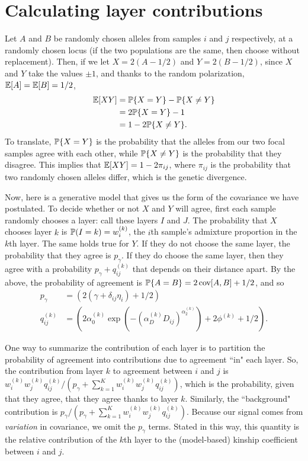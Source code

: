 \documentclass[12pt]{article}
\begin{document}
\newpage
\section{Calculating layer contributions}\label{layer_contribution}

Let $A$ and $B$ be randomly chosen alleles from samples $i$ and $j$ respectively,
at a randomly chosen locus 
(if the two populations are the same, then choose without replacement).
Then, if we let $X=2(A-1/2)$ and $Y=2(B-1/2)$,
since $X$ and $Y$ take the values $\pm 1$,
and thanks to the random polarization, $\E[A] = \E[B] = 1/2$,
$$\begin{aligned}
\E[XY]
        &= \P\{ X=Y \} - \P\{ X \neq Y \} \\
        &= 2 \P\{ X=Y \} - 1 \\
        &= 1 - 2 \P\{ X \neq Y \} .
\end{aligned}$$
To translate, $\P\{ X=Y \}$ is the probability that the alleles from our two focal samples agree with each other,
while $\P\{ X \neq Y \}$ is the probability that they disagree.
This implies that $\E[XY] = 1 - 2 \pi_{ij}$, 
where $\pi_{ij}$ is the probability that two randomly chosen alleles differ, 
which is the genetic divergence.

Now, here is a generative model that gives us the form of the covariance we have postulated.
To decide whether or not $X$ and $Y$ will agree,
first each sample randomly chooses a layer: call these layers $I$ and $J$.
The probability that $X$ chooses layer $k$ is $\P({I=k})=w_i^{(k)}$, 
the $i$th sample's admixture proportion in the $k$th layer.
The same holds true for $Y$.
If they do not choose the same layer, the probability that they agree is $p_\gamma$.
If they do choose the same layer, 
then they agree with a probability $p_\gamma + q^{(k)}_{ij}$ that depends on their distance apart.
By the above,
the probability of agreement is $\P\{A=B\} = 2 \cov[A,B] + 1/2$,
and so
$$\begin{aligned}
    p_\gamma &= (2 (\gamma + \delta_{ij} \eta_i) + 1/2) \\
    q^{(k)}_{ij} &= \left(2 \alpha_0^{(k)} \exp\left( - \left(\alpha_D^{(k)} D_{ij}\right)^{\alpha_2^{(k)}} \right) + 2 \phi^{(k)}  + 1/2 \right) .
\end{aligned}$$

One way to summarize the contribution of each layer is to partition the probability of agreement
into contributions due to agreement ``in" each layer.
So, the contribution from layer $k$ to agreement between $i$ and $j$ is 
$w_i^{(k)} w_j^{(k)} q^{(k)}_{ij} / (p_\gamma + \sum_{k=1}^K w_i^{(k)} w_j^{(k)} q^{(k)}_{ij})$,
which is the probability, given that they agree, that they agree thanks to layer $k$.
Similarly, the ``background" contribution is $p_\gamma / (p_\gamma + \sum_{k=1}^K w_i^{(k)} w_j^{(k)} q^{(k)}_{ij})$.
Because our signal comes from \emph{variation} in covariance, we omit
the $p_\gamma$ terms. 
Stated in this way, this quantity is the
relative contribution of the $k$th layer to the (model-based) kinship
coefficient between $i$ and $j$.
\end{document}
